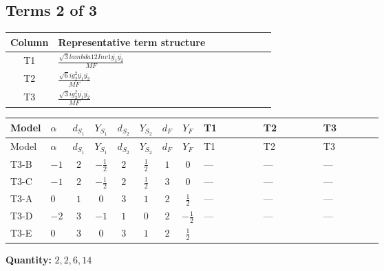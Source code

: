 \documentclass[8pt]{article}
\begin{document}
\begin{landscape}
\subsection*{Terms 2 of 3}
\begin{center}
\begin{tabular}{@{}c >{\raggedright\arraybackslash}p{0.82\linewidth}@{}}
\toprule
Column & Representative term structure \\
\midrule
T1 & \(\displaystyle \frac{\sqrt{3} lambda12Inv1 \overline{y_{1}} \overline{y_{2}}}{MF}\) \\
\midrule
T2 & \(\displaystyle \frac{\sqrt{6} i g_{2}^{2} \overline{y_{1}} \overline{y_{2}}}{MF}\) \\
\midrule
T3 & \(\displaystyle \frac{\sqrt{3} i g_{2}^{2} \overline{y_{1}} \overline{y_{2}}}{MF}\) \\
\midrule
\bottomrule
\end{tabular}
\end{center}
\smallskip
\tiny
\begin{longtable}{@{}llcccccc >{\raggedright\arraybackslash}p{0.21\linewidth} >{\raggedright\arraybackslash}p{0.21\linewidth} >{\raggedright\arraybackslash}p{0.21\linewidth}@{}}
\toprule
Model & $\alpha$ & $d_{S_1}$ & $Y_{S_1}$ & $d_{S_2}$ & $Y_{S_2}$ & $d_F$ & $Y_F$ & T1 & T2 & T3 \\
\midrule
\endfirsthead
\toprule
Model & $\alpha$ & $d_{S_1}$ & $Y_{S_1}$ & $d_{S_2}$ & $Y_{S_2}$ & $d_F$ & $Y_F$ & T1 & T2 & T3 \\
\midrule
\endhead
T3-B & $-1$ & $2$ & $-\frac{1}{2}$ & $2$ & $\frac{1}{2}$ & $1$ & $0$ & --- & --- & --- \\
\midrule
T3-C & $-1$ & $2$ & $-\frac{1}{2}$ & $2$ & $\frac{1}{2}$ & $3$ & $0$ & --- & --- & --- \\
\midrule
T3-A & $0$ & $1$ & $0$ & $3$ & $1$ & $2$ & $\frac{1}{2}$ & --- & --- & --- \\
\midrule
T3-D & $-2$ & $3$ & $-1$ & $1$ & $0$ & $2$ & $-\frac{1}{2}$ & --- & --- & --- \\
\midrule
T3-E & $0$ & $3$ & $0$ & $3$ & $1$ & $2$ & $\frac{1}{2}$ & \scriptsize\adjustbox{max width=\linewidth}{$\begin{gathered} \frac{\sqrt{3} lambda12Inv1 \overline{y_{1}} \overline{y_{2}}}{6 MF}\end{gathered}$} & \scriptsize\adjustbox{max width=\linewidth}{$\begin{gathered} \frac{\sqrt{6} i g_{2}^{2} \overline{y_{1}} \overline{y_{2}}}{3 MF}\end{gathered}$} & \scriptsize\adjustbox{max width=\linewidth}{$\begin{gathered} \frac{\sqrt{3} i g_{2}^{2} \overline{y_{1}} \overline{y_{2}}}{6 MF}\end{gathered}$} \\
\midrule
\bottomrule
\end{longtable}
\clearpage
\noindent\textbf{Quantity: }$\mathrm{2,2,6,14}$\par\smallskip

\end{landscape}
\end{document}
